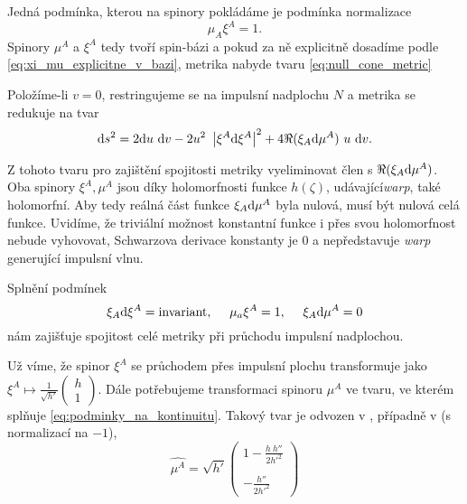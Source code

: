 Jedná podmínka, kterou na spinory pokládáme je podmínka normalizace
\begin{equation}
    \mu_A \xi^A = 1.
\end{equation}
Spinory $\mu^A$ a $\xi^A$ tedy tvoří spin-bázi a pokud za ně explicitně dosadíme podle
\eqref{eq:xi_mu_explicitne_v_bazi}, metrika nabyde tvaru \eqref{eq:null_cone_metric}

Položíme-li $v=0$, restringujeme se na impulsní nadplochu $N$ a metrika se redukuje na tvar
\begin{equation}
    \mathrm{d} s^2 = 2 \mathrm{d} u ~\mathrm{d} v - 2 u^2 ~\left| \xi^A \mathrm{d} \xi^A \right|^2 + 4 \Re(\xi_A \mathrm{d} \mu^A) ~u~ \mathrm{d} v.
\end{equation}

Z tohoto tvaru pro zajištění spojitosti metriky vyeliminovat člen s $\Re(\xi_A \mathrm{d} \mu^A)$. Oba spinory
$\xi^A, \mu^A$ jsou díky holomorfnosti funkce $h(\zeta)$, udávající\emph{warp}, také holomorfní. Aby tedy reálná část
funkce $\xi_A \mathrm{d} \mu^A$ byla nulová, musí být nulová celá funkce. Uvidíme, že triviální možnost konstantní funkce i přes svou holomorfnost
nebude vyhovovat, Schwarzova derivace konstanty je 0 a nepředstavuje \emph{warp} generující impulsní vlnu.

Splnění podmínek 
\begin{equation}
    \label{eq:podminky_na_kontinuitu}
    \xi_A \mathrm{d} \xi^A = \text{invariant}, ~~~~ \mu_a \xi^A = 1,~~~~ \xi_A \mathrm{d} \mu^A = 0
\end{equation}
nám zajišťuje spojitost celé metriky při průchodu impulsní nadplochou.

Už víme, že spinor $\xi^A$ se průchodem přes impulsní plochu transformuje jako $\xi^A \mapsto \frac{1}{\sqrt{h'}} \begin{pmatrix}
    h \\ 1
\end{pmatrix}$. Dále potřebujeme transformaci spinoru $\mu^A$ ve tvaru, ve kterém splňuje \eqref{eq:podminky_na_kontinuitu}.
Takový tvar je odvozen v \cite{scholtz_notes}, případně v \cite{Aliev2001} (s normalizací na $-1$),
\begin{equation}
    \label{eq:mu_transformace}
    \hat{\mu^A} = \sqrt{h'} \begin{pmatrix}
        1 - \frac{h ~h''}{2 h'^2} \\ ~ \\ - \frac{h''}{2 h'^2}
    \end{pmatrix}
\end{equation}

